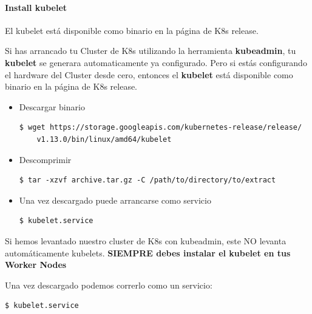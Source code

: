 \documentclass{article}
\newenvironment{blocktemplateIII}[1]{%
    \tcolorbox[beamer,%
    noparskip,breakable,
    ,colframe=Red,%
    colbacklower=LimeGreen!75!LightGreen,%
    title=#1]}%
    {\endtcolorbox}
\newenvironment{codetemplate}[1][]{%
  \mybasecolorbox[#1]
  \itshape
}{%
  \endmybasecolorbox
}
\begin{document}
\paragraph{Install kubelet}

El kubelet está disponible como binario en la página de K8s release.

Si has arrancado tu Cluster de K8s utilizando la herramienta \textbf{kubeadmin}, tu \textbf{kubelet} se generara automaticamente ya configurado. Pero si estás configurando el hardware del Cluster desde cero, entonces el \textbf{kubelet} está disponible como binario en la página de K8s release.

\begin{itemize}
    \item Descargar binario
\begin{codetemplate}{}
\begin{verbatim}
$ wget https://storage.googleapis.com/kubernetes-release/release/
    v1.13.0/bin/linux/amd64/kubelet
\end{verbatim}
\end{codetemplate}

    \item Descomprimir
\begin{codetemplate}{}
\begin{verbatim}
$ tar -xzvf archive.tar.gz -C /path/to/directory/to/extract
\end{verbatim}
\end{codetemplate} 

    \item Una vez descargado puede arrancarse como servicio
\begin{codetemplate}{}
\begin{verbatim}
$ kubelet.service
\end{verbatim}
\end{codetemplate}
\end{itemize}

\begin{blocktemplateIII}{Warning}
Si hemos levantado nuestro cluster de K8s con kubeadmin, este NO levanta automáticamente kubelets. \textbf{SIEMPRE debes instalar el kubelet en tus Worker Nodes}
\end{blocktemplateIII}

Una vez descargado podemos correrlo como un servicio:

\begin{codetemplate}{}
\begin{verbatim}
$ kubelet.service
\end{verbatim}
\end{codetemplate}
\end{document}
